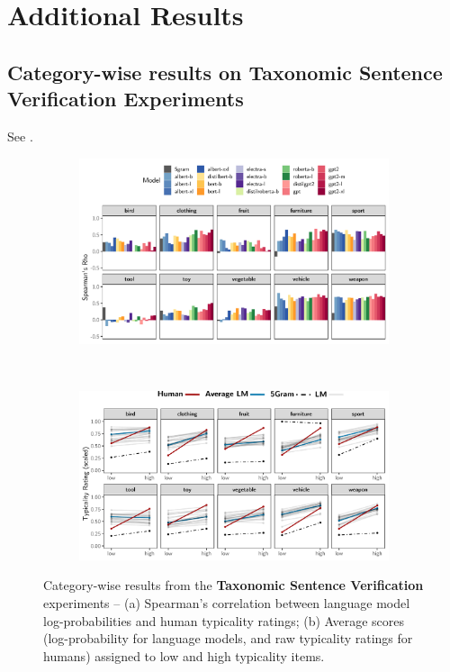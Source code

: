 \documentclass[a4paper, 11pt]{article}
\begin{document}
\section{Additional Results}
\subsection{Category-wise results on Taxonomic Sentence Verification Experiments}

See .

\begin{figure}[h]
    \centering
    \begin{subfigure}[b]{\textwidth}
        \includegraphics[width = \textwidth]{../paper/tsv_categorywise.pdf}
        \caption{}
    \end{subfigure}\\
    \vspace{1em}
    \begin{subfigure}[b]{\textwidth}
        \includegraphics[width = \textwidth]{../paper/categorywisetsv.pdf}
        \caption{}
    \end{subfigure}
    \caption{Category-wise results from the \textbf{Taxonomic Sentence Verification} experiments -- (a) Spearman's correlation between language model log-probabilities and human typicality ratings; (b) Average scores (log-probability for language models, and raw typicality ratings for humans) assigned to low and high typicality items.}
    \label{fig:tsvcategory}
\end{figure}
\end{document}
